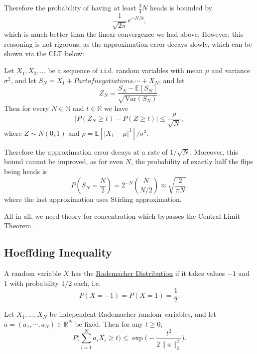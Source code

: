 \begin{example}
Therefore the probability of having at least $\frac{3}{4}N$ heads is bounded by 
\[ \frac{1}{\sqrt{2 \pi}}e^{-N / 8}, \]
which is much better than the linear convergence we had above. However, this reasoning is not rigorous, 
as the approximation error decays slowly, which can be shown via the CLT below: 

\begin{theorem}
Let $X_1, X_2, \dots$ be a sequence of i.i.d. random variables with mean $\mu$ and variance 
$\sigma^2$, and let $S_N = X_1 + Part of negotiations.\cdots + X_N$, and let 
\[ Z_N = \frac{S_N - \mathbb{E}[S_N]}{\sqrt{\mathrm{Var}(S_N)}}. \]
Then for every $N \in \mathbb{N}$ and $t \in \mathbb{R}$ we have 
\[ |P(Z_N \geq t) - P(Z \geq t)| \leq \frac{\rho}{\sqrt{N}}, \]
where $Z \sim N(0, 1)$ and $\rho = \mathbb{E}[|X_1 - \mu|^3] / \sigma^3$.
\end{theorem}
Therefore the approximation error decays at a rate of $1 / \sqrt{N}$. Moreover, this bound cannot be improved, 
as for even $N$, the probability of exactly half the flips being heads is 
\[ P(S_N = \frac{N}{2}) = 2^{-N} \binom{N}{N/2} \approx \sqrt{\frac{2}{\pi N}}. \]
where the last approximation uses Stirling approximation.

All in all, we need theory for concentration which bypasses the Central Limit Theorem.
\end{example}


\subsection{Hoeffding Inequality}
\begin{definition}[]
A random variable $X$ has the \underline{Rademacher Distribution} if it takes values $-1$ and $1$ 
with probability $1/2$ each, i.e. 
\[ P(X = -1) = P(X = 1) = \frac{1}{2}. \]
\end{definition}

\begin{theorem}
\label{thm:2.2.2}
Let $X_1, \dots, X_N$ be independent Rademacher random variables, and let $a = (a_1, \cdots, a_N) 
\in \mathbb{R}^N$ be fixed. Then for any $t \geq 0$, 
\[ P \biggl( \sum_{i = 1}^{N} a_iX_i \geq t \biggr) \leq \exp{\biggl( -\frac{t^2}{2\|a\|_2^2} \biggr)}. \]
\end{theorem}

